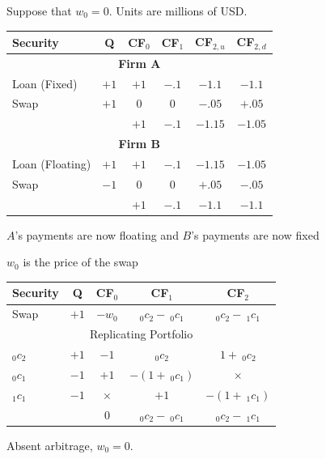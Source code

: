 \begin{frame}{}
    Suppose that $w_{0}=0$. Units are millions of USD.
    \begin{center}
        \begin{tabular}{lccccc}
            Security & Q & CF$_{0}$ & CF$_{1}$ & CF$_{2,u}$ & CF$_{2,d}$\\ \hline
            \multicolumn{6}{c}{\textbf{Firm A}} \\ \hline
            Loan (Fixed) & $+1$ & $+1$ & $-.1$ & $-1.1$ & $-1.1$ \\
            Swap & $+1$ & $0$ & $0$ & $-.05$ & $+.05$ \\ \hline
            & & $+1$ & $-.1$ & $-1.15$ & $-1.05$\\ \hline
            \multicolumn{6}{c}{\textbf{Firm B}} \\ \hline
            Loan (Floating) & $+1$ & $+1$ & $-.1$ & $-1.15$ & $-1.05$ \\
            Swap & $-1$ & $0$ & $0$ & $+.05$ & $-.05$ \\ \hline
            & & $+1$ & $-.1$ & $-1.1$ & $-1.1$
        \end{tabular}
    \end{center}
    $A$'s payments are now floating and $B$'s payments are now fixed
\end{frame}

\begin{frame}{}
    $w_{0}$ is the price of the swap
    \begin{center}
        \begin{tabular}{lcccc}
            Security & Q & CF$_{0}$ & CF$_{1}$ & CF$_{2}$\\ \hline
            Swap & $+1$ & $-w_{0}$ & $_{0}c_{2}-\:_{0}c_{1}$ & $_{0}c_{2}-\:_{1}c_{1}$ \\ \hline
            \multicolumn{5}{c}{Replicating Portfolio} \\ \hline
            $_{0}c_{2}$ & $+1$ & $-1$ & $_{0}c_{2}$ & $1+\:_{0}c_{2}$ \\
            $_{0}c_{1}$ & $-1$ & $+1$ & $-(1+\:_{0}c_{1})$ & $\times$ \\
            $_{1}c_{1}$ & $-1$ & $\times$ & $+1$ & $-(1+\:_{1}c_{1})$\\ \hline
            & & $0$ & $_{0}c_{2}-\:_{0}c_{1}$ & $_{0}c_{2}-\:_{1}c_{1}$
        \end{tabular}
    \end{center}
    Absent arbitrage, $w_{0}=0$. 
\end{frame}

